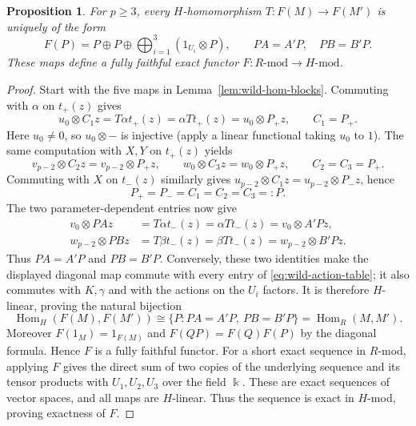 \documentclass[10pt,oneside]{amsart}
\newcommand{\kk}{\Bbbk}
\newtheorem{proposition}{Proposition}[section]
\theoremstyle{definition}
\begin{document}
\begin{proposition}\label{prop:wild-full-faithful}
For $p\ge3$, every $H$-homomorphism $T:F(M)\to F(M')$ is uniquely
of the form
\[
 F(P)=P\oplus P\oplus\bigoplus_{i=1}^{3}(1_{U_i}\otimes P),
 \qquad PA=A'P,\quad PB=B'P.
\]
These maps define a fully faithful exact functor $F:R\text{-mod}\to H\text{-mod}$.
\end{proposition}
\begin{proof}
Start with the five maps in Lemma~\ref{lem:wild-hom-blocks}.
Commuting with $\alpha$ on $t_+(z)$ gives
\[
 u_0\otimes C_1z=T\alpha t_+(z)
               =\alpha Tt_+(z)=u_0\otimes P_+z,
 \qquad C_1=P_+.
\]
Here $u_0\ne0$, so $u_0\otimes-$ is injective (apply a linear
functional taking $u_0$ to $1$). The same computation with $X,Y$
on $t_+(z)$ yields
\[
 v_{p-2}\otimes C_2z=v_{p-2}\otimes P_+z,\qquad
 w_0\otimes C_3z=w_0\otimes P_+z,
 \qquad C_2=C_3=P_+.
\]
Commuting with $X$ on $t_-(z)$ similarly gives
$u_{p-2}\otimes C_1z=u_{p-2}\otimes P_-z$, hence
\[
 P_+=P_-=C_1=C_2=C_3=:P.
\]
The two parameter-dependent entries now give
\begin{align*}
 v_0\otimes PAz&=T\alpha t_-(z)=\alpha Tt_-(z)=v_0\otimes A'Pz,\\
 w_{p-2}\otimes PBz&=T\beta t_-(z)=\beta Tt_-(z)=w_{p-2}\otimes B'Pz.
\end{align*}
Thus $PA=A'P$ and $PB=B'P$.
Conversely, these two identities make the displayed diagonal map
commute with every entry of \eqref{eq:wild-action-table}; it also
commutes with $K,\gamma$ and with the actions on the $U_i$ factors.
It is therefore $H$-linear, proving the natural bijection
\begin{equation}\label{eq:wild-hom}
 \operatorname{Hom}_H(F(M),F(M'))
 \cong\{P:PA=A'P,\ PB=B'P\}
 =\operatorname{Hom}_R(M,M').
\end{equation}
Moreover $F(1_M)=1_{F(M)}$ and $F(QP)=F(Q)F(P)$ by the diagonal
formula. Hence $F$ is a fully faithful functor.
For a short exact sequence in $R$-mod, applying $F$ gives the direct
sum of two copies of the underlying sequence and its tensor products
with $U_1,U_2,U_3$ over the field $\kk$. These are exact sequences of
vector spaces, and all maps are $H$-linear. Thus the sequence is
exact in $H$-mod, proving exactness of $F$.
\end{proof}
\end{document}
